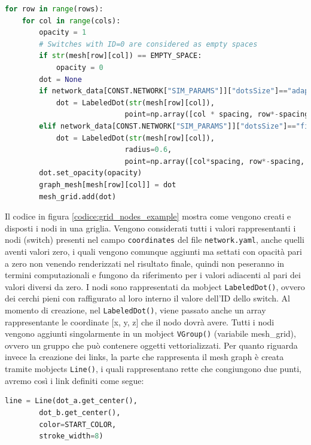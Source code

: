 \documentclass[binding=0.6cm]{sapthesis}
\begin{document}
{\scriptsize %
\begin{lstlisting}[language=Python, caption={Creazione posizionamento nodi griglia}, label={codice:grid_nodes_example}]
for row in range(rows):
    for col in range(cols):
        opacity = 1
        # Switches with ID=0 are considered as empty spaces
        if str(mesh[row][col]) == EMPTY_SPACE:
            opacity = 0
        dot = None
        if network_data[CONST.NETWORK["SIM_PARAMS"]]["dotsSize"]=="adaptive":
            dot = LabeledDot(str(mesh[row][col]), 
                            point=np.array([col * spacing, row*-spacing, 0]))
        elif network_data[CONST.NETWORK["SIM_PARAMS"]]["dotsSize"]=="fixed":
            dot = LabeledDot(str(mesh[row][col]), 
                            radius=0.6, 
                            point=np.array([col*spacing, row*-spacing, 0]))
        dot.set_opacity(opacity)
        graph_mesh[mesh[row][col]] = dot
        mesh_grid.add(dot)
\end{lstlisting}
}

Il codice in figura \ref{codice:grid_nodes_example} mostra come vengono creati e disposti i nodi in una griglia. 
Vengono considerati tutti i valori rappresentanti i nodi (switch)
presenti nel campo \texttt{coordinates} del file \texttt{network.yaml}, anche quelli aventi valori zero,
 i quali vengono comunque aggiunti ma settati con opacità pari a zero non venendo renderizzati nel risultato finale,
quindi non peseranno in termini computazionali e fungono da riferimento per i valori adiacenti al pari dei valori diversi da zero.
I nodi sono rappresentati da mobject \lstinline|LabeledDot()|, ovvero dei cerchi pieni con raffigurato al loro interno il valore dell'ID dello switch. Al momento di creazione, nel \lstinline|LabeledDot()|,
viene passato anche un array rappresentante le coordinate [x, y, z] che il nodo dovrà avere. 
Tutti i nodi vengono aggiunti singolarmente in un mobject \lstinline|VGroup()| (variabile mesh\_grid),
ovvero un gruppo che può contenere oggetti vettorializzati.
Per quanto riguarda invece la creazione dei links, la parte che rappresenta il mesh graph è creata tramite mobjects \lstinline|Line()|, i quali
rappresentano rette che congiungono due punti, avremo così i link definiti come segue:

{\scriptsize %
\begin{lstlisting}[language=Python, caption={Creazione link}, label={codice:link_creation_example}]
    line = Line(dot_a.get_center(), 
        dot_b.get_center(), 
        color=START_COLOR, 
        stroke_width=8)
\end{lstlisting}
}
\end{document}
